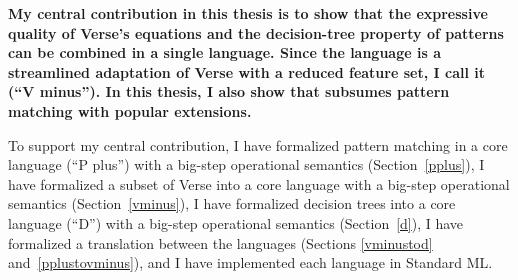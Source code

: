 \documentclass[manuscript,screen,review, 12pt, nonacm]{acmart}
\begin{document}

\bf{My central contribution in this thesis} is to show that the expressive
quality of Verse's equations and the decision-tree property of patterns can be
combined in a single language. Since the language is a streamlined adaptation of
Verse with a reduced feature set, I call it \VMinus (“V minus”). In this thesis,
I also show that \VMinus subsumes pattern matching with popular extensions. 

To support my central contribution, 
I have formalized pattern matching in a core language \PPlus (“P plus”) with a
big-step operational semantics (Section~\ref{pplus}),
I have formalized a subset of Verse into a core language \VMinus with a big-step
operational semantics (Section~\ref{vminus}), 
I have formalized decision trees into a core language \D (“D”) with a big-step
operational semantics (Section~\ref{d}), 
I have formalized a translation between
the languages (Sections \ref{vminustod} and~\ref{pplustovminus}), 
and I have implemented each language in Standard ML. 
\end{document}
